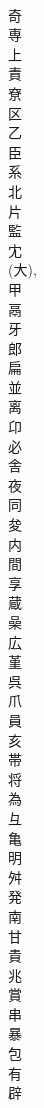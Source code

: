 \documentclass[8pt]{extreport}
\begin{document}
\begin{CJK}{UTF8}{min}
\\	奇	
\\	専	
\\	上	
\\	責	
\\	尞	
\\	区	
\\	乙	
\\	臣	
\\	系	
\\	北	
\\	片	
\\	監	
\\	冘	
\\	(大), 
\\	甲	
\\	鬲	
\\	牙	
\\	郎	
\\	扁	
\\	並	
\\	离	
\\	卬	
\\	必	
\\	舎	
\\	夜	
\\	同	
\\	夋	
\\	内	
\\	間	
\\	享	
\\	蔵	
\\	喿	
\\	広	
\\	堇	
\\	呉	
\\	爪	
\\	員	
\\	亥	
\\	帯	
\\	将	
\\	為	
\\	彑	
\\	亀	
\\	明	
\\	舛	
\\	発	
\\	南	
\\	甘	
\\	貴	
\\	兆	
\\	賞	
\\	串	
\\	暴	
\\	包	
\\	有	
\\	辟	

\end{CJK}
\end{document}
